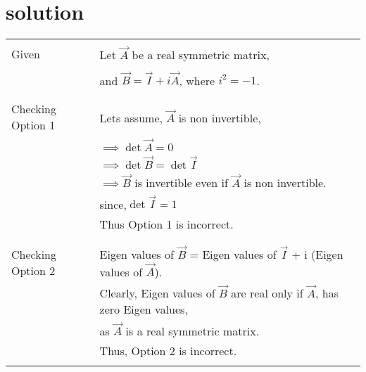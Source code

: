 \documentclass[journal,12pt,twocolumn]{IEEEtran}
\begin{document}
\section{solution}
\begin{table}[h!]
\begin{center}
\begin{tabular}{|p{5cm}|p{10cm}|}
\hline
& \\
Given &Let $\vec{A}$ be a real symmetric matrix,\\
&\\
& and $\vec{B}=\vec{I}+i\vec{A}$, where $i^2=-1$.\\
&\\
\hline
&\\
Checking Option 1
& Lets assume, $\vec{A}$ is non invertible,\\&$\implies \det\vec{A}=0$\\&$\implies \det\vec{B}=\det\vec{I}$\\&$\implies\vec{B}$ is invertible even if $\vec{A}$ is non invertible.  \\& since,$\det\vec{I}=1$\\&Thus Option 1 is incorrect.  \\
&\\
\hline
&\\
Checking Option 2 
& Eigen values of $\vec{B}$ = Eigen values of  $\vec{I}$ + i (Eigen values of $\vec{A}$).\\& Clearly, Eigen values of $\vec{B}$ are real only if $\vec{A}$, has zero Eigen values,\\&as $\vec{A}$ is a real symmetric matrix.\\&
Thus, Option 2 is incorrect.\\
& \\
\hline
\end{tabular}
\end{center}
\end{table}
\newpage
\end{document}
